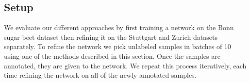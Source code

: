 \documentclass[letterpaper, 10 pt, conference]{ieeeconf}  %
\begin{document}

%
%
%
%
%


\subsection{Setup}

We evaluate our different approaches by first training a network on the Bonn sugar beet dataset then refining it on the Stuttgart and Zurich datasets separately. To refine the network we pick unlabeled samples in batches of 10 using one of the methods described in this section. Once the samples are annotated, they are given to the network. We repeat this process iteratively, each time refining the network on all of the newly annotated samples. 

\end{document}
